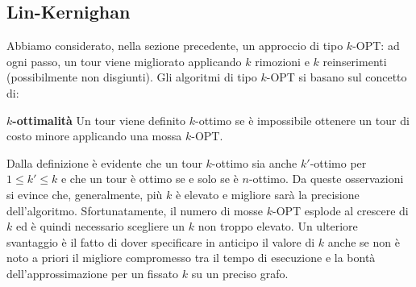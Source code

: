 
\subsection{Lin-Kernighan}

Abbiamo considerato, nella sezione precedente, un approccio di tipo $k$-OPT: ad ogni passo,
un tour viene migliorato applicando $k$ rimozioni e $k$ reinserimenti (possibilmente non disgiunti).
Gli algoritmi di tipo $k$-OPT si basano sul concetto di:
\begin{definition}{\textbf{$k$-ottimalità}}
    Un tour viene definito $k$-ottimo se è impossibile ottenere un tour di costo minore
    applicando una mossa $k$-OPT.
\end{definition}

Dalla definizione è evidente che un tour $k$-ottimo sia anche $k'$-ottimo per $1\leq{}k'\leq{}k$ e che
un tour è ottimo se e solo se è $n$-ottimo. Da queste osservazioni si evince che, generalmente, più
$k$ è elevato e migliore sarà la precisione dell'algoritmo. Sfortunatamente, il numero di mosse 
$k$-OPT esplode al crescere di $k$ ed è quindi necessario scegliere un $k$ non troppo elevato. Un ulteriore
svantaggio è il fatto di dover specificare in anticipo il valore di $k$ anche se non è noto a priori il 
migliore compromesso tra il tempo di esecuzione e la bontà dell'approssimazione per un fissato $k$ su un 
preciso grafo.

